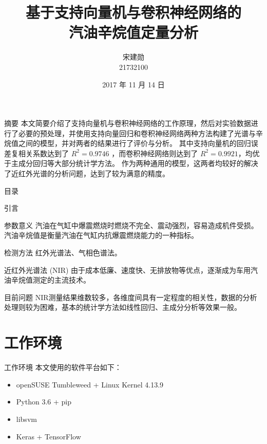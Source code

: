 \documentclass[11pt]{beamer}
\begin{document}
	\author{宋建勋 \\ 21732100}
	\title[汽油辛烷值定量分析]{基于支持向量机与卷积神经网络的 \\ 汽油辛烷值定量分析}
	\date{2017 年 11 月 14 日}
	\begin{frame}[plain]
		\maketitle
	\end{frame}
	\begin{frame}{摘要}
		本文简要介绍了支持向量机与卷积神经网络的工作原理，然后对实验数据进行了必要的预处理，并使用支持向量回归和卷积神经网络两种方法构建了光谱与辛烷值之间的模型，并对两者的结果进行了评价与分析。
		其中支持向量机的回归误差复相关系数达到了 $R^2=0.9746$ ，而卷积神经网络则达到了 $R^2=0.9921$，均优于主成分回归等大部分统计学方法。
		作为两种通用的模型，这两者均较好的解决了近红外光谱的分析问题，达到了较为满意的精度。
	\end{frame}
	
	\begin{frame}{目录}
		\tableofcontents
	\end{frame}
	
	\begin{frame}{引言}
		\begin{block}{参数意义}
			汽油在气缸中爆震燃烧时燃烧不完全、震动强烈，容易造成机件受损。
			汽油辛烷值是衡量汽油在气缸内抗爆震燃烧能力的一种指标。
		\end{block}
		
		\begin{block}{检测方法}
			红外光谱法、气相色谱法。
			
			近红外光谱法 (NIR) 由于成本低廉、速度快、无排放物等优点，逐渐成为车用汽油辛烷值测定的主流技术。
		\end{block}
		\begin{block}{目前问题}
			NIR测量结果维数较多，各维度间具有一定程度的相关性，数据的分析处理则较为困难，基本的统计学方法如线性回归、主成分分析等效果一般。
		\end{block}
	\end{frame}
		
	\section{工作环境}
	\begin{frame}{工作环境}
		\noindent 本文使用的软件平台如下：
		\begin{itemize}
			\item openSUSE Tumbleweed + Linux Kernel 4.13.9
			\item Python 3.6 + pip
			\item libsvm
			\item Keras + TensorFlow
		\end{itemize}
	\end{frame}
	
\end{document}
